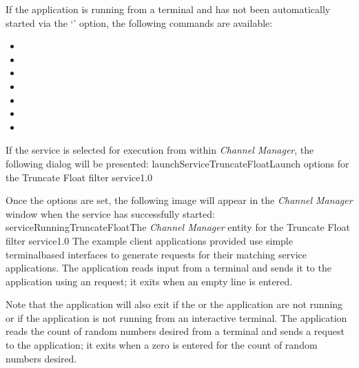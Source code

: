 If the application is running from a terminal and has not been automatically started via
the `' option, the following commands are available:
\begin{itemize}
\item{}
\item\exSp{}
\item\exSp{}
\item\exSp{}
\item\exSp{}
\item\exSp{}
\item\exSp{}
\end{itemize}
\condPage
If the service is selected for execution from within \emph{Channel Manager}, the following
dialog will be presented:
%
{launchServiceTruncateFloat}{Launch options for the Truncate Float filter service}{1.0}

Once the options are set, the following image will appear in the \emph{Channel Manager}
window when the service has successfully started:
%
{serviceRunningTruncateFloat}{The \emph{Channel Manager} entity for the Truncate Float
filter service}{1.0}
\secondaryEnd
\condPage
{}
The example client applications provided use simple terminal\longDash{}based interfaces to
generate requests for their matching service applications.
The  application reads input from a terminal and
sends it to the  application using an
 request; it exits when an empty line is
entered.\\

\insertShortClientParameters{}

Note that the application will also exit if the
 or the
 application are not running or if the application
is not running from an interactive terminal.
The  application reads the count of
random numbers desired from a terminal and sends a
 request to the
 application; it exits when a zero is
entered for the count of random numbers desired.

